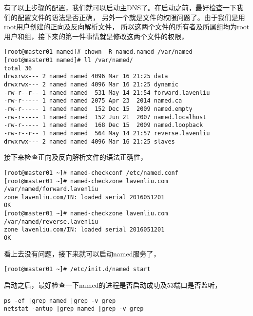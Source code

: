 有了以上步骤的配置，我们就可以启动主DNS了。在启动之前，最好检查一下我们的配置文件的语法是否正确，
另外一个就是文件的权限问题了。由于我们是用root用户创建的正向及反向解析文件，
所以这两个文件的所有者及所属组均为root用户和组，接下来的第一件事情就是修改这两个文件的权限，

\begin{verbatim}
[root@master01 named]# chown -R named.named /var/named
[root@master01 named]# ll /var/named/
total 36
drwxrwx--- 2 named named 4096 Mar 16 21:25 data
drwxrwx--- 2 named named 4096 Mar 16 21:25 dynamic
-rw-r--r-- 1 named named  531 May 14 21:54 forward.lavenliu
-rw-r----- 1 named named 2075 Apr 23  2014 named.ca
-rw-r----- 1 named named  152 Dec 15  2009 named.empty
-rw-r----- 1 named named  152 Jun 21  2007 named.localhost
-rw-r----- 1 named named  168 Dec 15  2009 named.loopback
-rw-r--r-- 1 named named  564 May 14 21:57 reverse.lavenliu
drwxrwx--- 2 named named 4096 Mar 16 21:25 slaves
\end{verbatim}

接下来检查正向及反向解析文件的语法正确性，

\begin{verbatim}
[root@master01 ~]# named-checkconf /etc/named.conf
[root@master01 ~]# named-checkzone lavenliu.com /var/named/forward.lavenliu
zone lavenliu.com/IN: loaded serial 2016051201
OK
[root@master01 ~]# named-checkzone lavenliu.com /var/named/reverse.lavenliu
zone lavenliu.com/IN: loaded serial 2016051201
OK
\end{verbatim}

看上去没有问题，接下来就可以启动named服务了，
\begin{verbatim}
[root@master01 ~]# /etc/init.d/named start 
\end{verbatim}

启动之后，最好检查一下named的进程是否启动成功及53端口是否监听，

\begin{verbatim}
ps -ef |grep named |grep -v grep
netstat -antup |grep named |grep -v grep
\end{verbatim}

